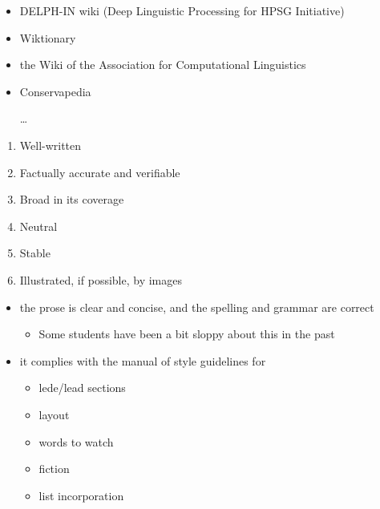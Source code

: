 \documentclass[a4paper,landscape,headrule,footrule,xetex]{foils}
\begin{document}
\begin{itemize}
\item DELPH-IN wiki (Deep Linguistic Processing for HPSG Initiative)
\item Wiktionary
\item the Wiki of the Association for Computational Linguistics
\item Conservapedia
\item[\ldots]
\end{itemize}



\begin{enumerate}
\item Well-written
\item Factually accurate and verifiable
\item Broad in its coverage
\item Neutral
\item Stable
\item Illustrated, if possible, by images
\end{enumerate}


\begin{itemize}
\item  the prose is clear and concise, and the spelling and grammar are correct
  \begin{itemize}
  \item Some students have been a bit sloppy about this in the past
  \end{itemize}
\item  it complies with the manual of style guidelines for 
  \begin{itemize}
  \item lede/lead sections
  \item layout
  \item words to watch
  \item fiction
  \item list incorporation
  \end{itemize}
\end{itemize}

\end{document}
